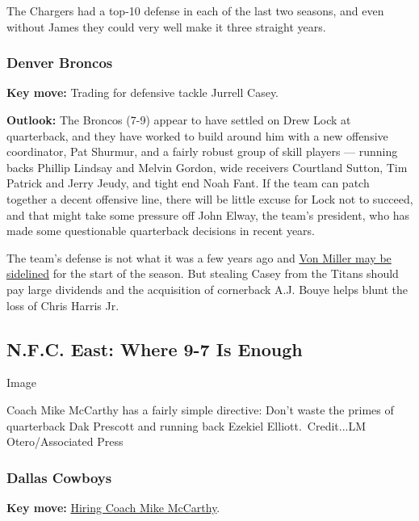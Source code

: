 The Chargers had a top-10 defense in each of the last two seasons, and
even without James they could very well make it three straight years.

\hypertarget{denver-broncos}{%
\subsubsection{\texorpdfstring{\textbf{Denver
Broncos}}{Denver Broncos}}\label{denver-broncos}}

\textbf{Key move:} Trading for defensive tackle Jurrell Casey.

\textbf{Outlook:} The Broncos (7-9) appear to have settled on Drew Lock
at quarterback, and they have worked to build around him with a new
offensive coordinator, Pat Shurmur, and a fairly robust group of skill
players --- running backs Phillip Lindsay and Melvin Gordon, wide
receivers Courtland Sutton, Tim Patrick and Jerry Jeudy, and tight end
Noah Fant. If the team can patch together a decent offensive line, there
will be little excuse for Lock not to succeed, and that might take some
pressure off John Elway, the team's president, who has made some
questionable quarterback decisions in recent years.

The team's defense is not what it was a few years ago and
\href{https://twitter.com/RapSheet/status/1303712772140789762}{Von
Miller may be sidelined} for the start of the season. But stealing Casey
from the Titans should pay large dividends and the acquisition of
cornerback A.J. Bouye helps blunt the loss of Chris Harris Jr.

\hypertarget{nfc-east-where-9-7-is-enough}{%
\subsection{N.F.C. East: Where 9-7 Is
Enough}\label{nfc-east-where-9-7-is-enough}}

Image

Coach Mike McCarthy has a fairly simple directive: Don't waste the
primes of quarterback Dak Prescott and running back Ezekiel
Elliott.~Credit...LM Otero/Associated Press

\hypertarget{dallas-cowboys}{%
\subsubsection{\texorpdfstring{\textbf{Dallas
Cowboys}}{Dallas Cowboys}}\label{dallas-cowboys}}

\textbf{Key move:}
\href{https://www.nytimes3xbfgragh.onion/2020/01/06/sports/football/mike-mccarthy-jerry-jones-cowboys.html}{Hiring
Coach Mike McCarthy}.

